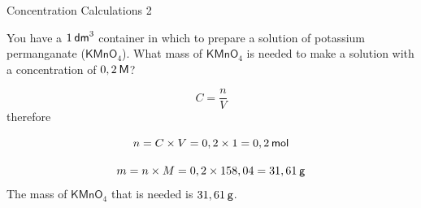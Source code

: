     \noindent
\par
            \label{m38712*secfhsst!!!underscore!!!id1722}\vspace{.5cm} 

      \begin{wex}{Concentration Calculations 2 }
{
\label{m38712*probfhsst!!!underscore!!!id1723}
      \label{m38712*id283214}You have a $1\phantom{\rule{2pt}{0ex}}{\mathsf{dm}}^{3}$ container in which to prepare a solution of potassium permanganate ($\mathsf{KMnO}{}_{4}$). What mass of $\mathsf{KMnO}{}_{4}$ is needed to make a solution with a concentration of $0,2\phantom{\rule{2pt}{0ex}}\mathsf{M}$?\par 
      \vspace{5pt}}
{
      \label{m38712*id283297}\nopagebreak\noindent{}
        
    \begin{equation}
    C=\frac{n}{V}
      \end{equation}
      \label{m38712*id283318}therefore\par 
      \label{m38712*id283321}\nopagebreak\noindent{}
        
    \begin{equation}
    n=C\ensuremath{\times}V=0,2\ensuremath{\times}1=0,2\phantom{\rule{2pt}{0ex}}\mathsf{mol}
      \end{equation}
      \label{m38712*id283387}\nopagebreak\noindent{}
        
    \begin{equation}
    m=n\ensuremath{\times}M=0,2\ensuremath{\times}158,04=31,61\phantom{\rule{2pt}{0ex}}\mathsf{g}
      \end{equation}
      \label{m38712*id283435}The mass of $\mathsf{KMnO}{}_{4}$ that is needed is $31,61\phantom{\rule{2pt}{0ex}}\mathsf{g}$.
 \par 
}
    \end{wex}
    \noindent
\label{m38712*secfhsst!!!underscore!!!id1795}\vspace{.5cm} 

